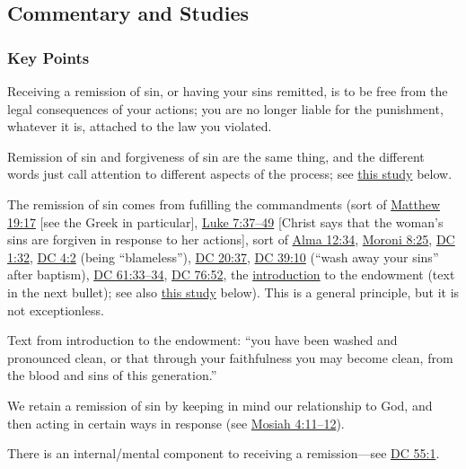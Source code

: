 	
\subsection{Commentary and Studies} %
	\label{REMISSION-COMMENTARY}

	\subsubsection{Key Points}
		\label{REMISSION-KEYS}
	
		\begin{compactitem}
			\item Receiving a remission of sin, or having your sins remitted, is to be free from the legal consequences of your actions; you are no longer liable for the punishment, whatever it is, attached to the law you violated.
			\item Remission of sin and forgiveness of sin are the same thing, and the different words just call attention to different aspects of the process; see \hyperref[REMISSION-forgiveness]{this study} below.
			\item The remission of sin comes from fufilling the commandments (sort of \hyperref[MATTHEW-19-17]{Matthew 19:17} [see the Greek in particular], \hyperref[LUKE-7-37]{Luke 7:37--49} [Christ says that the woman's sins are forgiven in response to her actions], sort of \hyperref[ALMA-12-34]{Alma 12:34}, \hyperref[MORONI-8-25]{Moroni 8:25}, \hyperref[DC1-32]{DC 1:32}, \hyperref[DC4-2]{DC 4:2} (being ``blameless''), \hyperref[DC20-37]{DC 20:37}, \hyperref[DC39-10]{DC 39:10} (``wash away your sins'' after baptism), \hyperref[DC61-33]{DC 61:33--34}, \hyperref[DC76-52]{DC 76:52}, the \hyperref[TEMPLE-ENDOWMENT-ENDOW-PRE-1990-INTRO]{introduction} to the endowment (text in the next bullet); see also \hyperref[REMISSION-commandments]{this study} below). This is a general principle, but it is not exceptionless.
				\begin{compactitem}
					\item Text from introduction to the endowment: ``you have been washed and pronounced clean, or that through your faithfulness you may become clean, from the blood and sins of this generation.''
				\end{compactitem}
			\item We retain a remission of sin by keeping in mind our relationship to God, and then acting in certain ways in response (see \hyperref[MOSIAH-4-11]{Mosiah 4:11--12}).
			\item There is an internal/mental component to receiving a remission---see \hyperref[DC55-1]{DC 55:1}.
		\end{compactitem}
		
